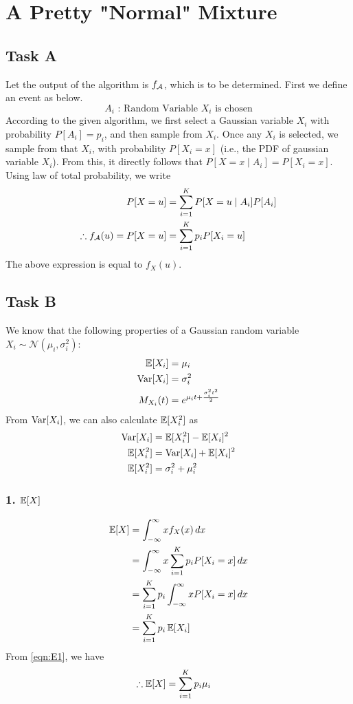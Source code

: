 \section{A Pretty "Normal" Mixture}
\subsection*{Task A}
Let the output of the algorithm is $f_{\cal{A}}$, which is to be determined.
First we define an event as below.
\[A_i\text{ : Random Variable }X_i\text{ is chosen}\]
According to the given algorithm, we first select a Gaussian variable $X_i$ with probability $P[A_i]=p_i$, and then sample from $X_i$.
Once any $X_i$ is selected, we sample from that $X_i$, with probability $P[X_i = x]$ (i.e., the PDF of gaussian variable $X_i$). From this, it directly follows that $P[X=x\mid A_i] = P[X_i = x]$.
Using law of total probability, we write
\begin{align*}
	P[X=u]                             & = \sum_{i=1}^K P[X=u\mid A_i]P[A_i] \\
	\therefore f_{\cal{A}}(u) = P[X=u] & = \sum_{i=1}^K p_i P[X_i=u]
\end{align*}
The above expression is equal to $f_X(u)$.

\subsection*{Task B}
We know that the following properties of a Gaussian random variable $X_i \sim \mathcal{N}(\mu_i, \sigma_i^2)$:
\begin{align}
	\operatorname{\mathbb{E}}[X_i]   & = \mu_i \label{eqn:E1}                                  \\
	\operatorname{Var}[X_i]  & = \sigma_i^2 \label{eqn:V1}                             \\
	M_{X_i}(t) & = e^{\mu_i t + \frac{\sigma_i^2 t^2}{2}} \label{eqn:M1}
\end{align}
From $\operatorname{Var}[X_i]$, we can also calculate $\operatorname{\mathbb{E}}[X_i^2]$ as
\begin{align}
	\operatorname{Var}[X_i]  & = \operatorname{\mathbb{E}}[X_i^2] - \operatorname{\mathbb{E}}[X_i]^2 \nonumber \\
	\operatorname{\mathbb{E}}[X_i^2] & = \operatorname{Var}[X_i] + \operatorname{\mathbb{E}}[X_i]^2 \nonumber  \\
	\operatorname{\mathbb{E}}[X_i^2] & = \sigma_i^2 + \mu_i^2
\end{align}
\subsubsection*{1. $\operatorname{\mathbb{E}}[X]$}
\begin{align*}
	\operatorname{\mathbb{E}}[X] & = \int_{-\infty}^{\infty} x f_X(x) \, dx                    \\
	       & = \int_{-\infty}^{\infty} x \sum_{i=1}^K p_i P[X_i=x] \, dx \\
	       & = \sum_{i=1}^K p_i \int_{-\infty}^{\infty} x P[X_i=x] \, dx \\
	       & = \sum_{i=1}^K p_i \operatorname{\mathbb{E}}[X_i]
\end{align*}
From \cref{eqn:E1}, we have
\begin{align}
	\therefore \operatorname{\mathbb{E}}[X] & = \sum_{i=1}^K p_i \mu_i \label{eqn:E2}
\end{align}
